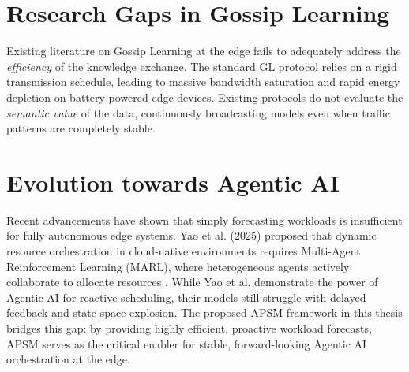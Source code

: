 \section{Research Gaps in Gossip Learning}
Existing literature on Gossip Learning at the edge fails to adequately address the \textit{efficiency} of the knowledge exchange. The standard GL protocol relies on a rigid transmission schedule, leading to massive bandwidth saturation and rapid energy depletion on battery-powered edge devices. Existing protocols do not evaluate the \textit{semantic value} of the data, continuously broadcasting models even when traffic patterns are completely stable.

\section{Evolution towards Agentic AI}
Recent advancements have shown that simply forecasting workloads is insufficient for fully autonomous edge systems. Yao et al. (2025) proposed that dynamic resource orchestration in cloud-native environments requires Multi-Agent Reinforcement Learning (MARL), where heterogeneous agents actively collaborate to allocate resources \cite{yao2025multi}. While Yao et al. demonstrate the power of Agentic AI for reactive scheduling, their models still struggle with delayed feedback and state space explosion. The proposed APSM framework in this thesis bridges this gap: by providing highly efficient, proactive workload forecasts, APSM serves as the critical enabler for stable, forward-looking Agentic AI orchestration at the edge.
